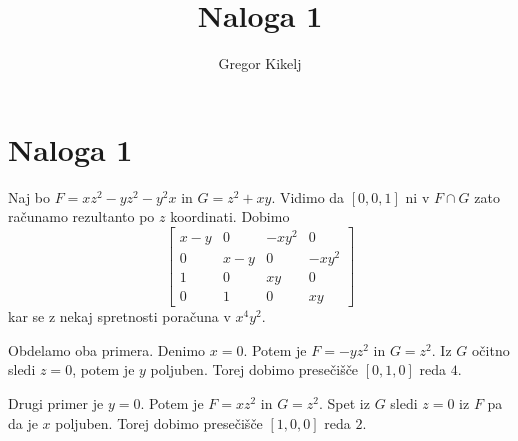 \documentclass[12pt]{article}
\title{Naloga 1}
\author{Gregor Kikelj}
\begin{document}
\section{Naloga 1}
Naj bo $F=xz^2-yz^2-y^2x$ in $G=z^2+xy$. Vidimo da $[0, 0, 1]$ ni v $F\cap G$ zato računamo rezultanto po $z$ koordinati. 
Dobimo \[\left[\begin{matrix}x - y & 0 & - x y^{2} & 0\\0 & x - y & 0 & - x y^{2}\\1 & 0 & x y & 0\\0 & 1 & 0 & x y\end{matrix}\right]\] kar se z nekaj spretnosti
poračuna v $x^4y^2$.

Obdelamo oba primera. 
Denimo $x=0$. Potem je $F=-yz^2$ in $G=z^2$. Iz $G$ očitno sledi $z=0$, potem je $y$ poljuben. Torej dobimo presečišče $[0, 1, 0]$ reda $4$.

Drugi primer je $y=0$. Potem je $F=xz^2$ in $G=z^2$. Spet iz $G$ sledi $z=0$ iz $F$ pa da je $x$ poljuben. Torej dobimo presečišče $[1, 0, 0]$ reda $2$.
\end{document}

